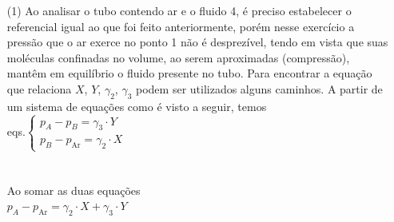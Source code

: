 \documentclass[
	a4paper,
	12pt,
	brazilian
]{article}
\begin{document}
	\newpage
	\begin{enumerate}
		\item[(1)] Ao analisar o tubo contendo ar e o fluido 4, é preciso estabelecer o referencial igual ao que foi feito anteriormente, porém nesse exercício a pressão que o ar exerce no ponto 1 não é desprezível, tendo em vista que suas moléculas confinadas no volume, ao serem aproximadas (compressão), mantêm em equilíbrio o fluido presente no tubo. Para encontrar a equação que relaciona $X$, $Y$, $\gamma_{2}$, $\gamma_{3}$ podem ser utilizados alguns caminhos. A partir de um sistema de equações como é visto a seguir, temos\\
		
		eqs.$
		\begin{cases}
			p_{A}-p_{B}=\gamma_{3}\cdot Y\\
			p_{B}-p_{\textrm{Ar}}=\gamma_{2}\cdot X
		\end{cases}
		$\\\\\\
		\noindent Ao somar as duas equações\\
		
		$p_{A}-p_{\textrm{Ar}}=\gamma_{2}\cdot X+\gamma_{3}\cdot Y$
		

\end{enumerate}
\end{document}
